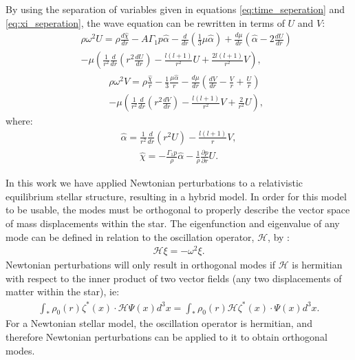 \documentclass[fleqn,usenatbib]{mnras}
\begin{document}
\hspace{\parindent}By using the separation of variables given in equations \ref{eq:time_seperation} and \ref{eq:xi_seperation}, the wave equation can be rewritten in terms of $U$ and $V$: 
\begin{align}\nonumber
&&\rho\omega^2U=\rho\frac{d\hat{\chi}}{dr}-A\Gamma_1 p\hat{\alpha}-\frac{d}{dr}\left(\frac{1}{3}\mu\hat{\alpha}\right)+\frac{d\mu}{dr}\left(\hat{\alpha}-2\frac{dU}{dr}\right)\\
&&-\mu\left(\frac{1}{r^2}\frac{d}{dr}\left( r^2\frac{dU}{dr}\right)-\frac{l(l+1)}{r^2}U+\frac{2l(l+1)}{r^2}V\right),
\label{eq:Ueqn}
\end{align}
\begin{align}\nonumber
&&\rho\omega^2V=\rho\frac{\hat{\chi}}{r}-\frac{1}{3}\frac{\mu\hat{\alpha}}{r}-\frac{d\mu}{dr}\left(\frac{dV}{dr}-\frac{V}{r}+\frac{U}{r}\right)\\
&&-\mu\left(\frac{1}{r^2}\frac{d}{dr}\left(r^2\frac{dV}{dr}\right)-\frac{l(l+1)}{r^2}V+\frac{2}{r^2}U\right),
\label{eq:Veqn}
\end{align}
\noindent where:
\begin{align}
\hat{\alpha}=\frac{1}{r^2}\frac{d}{dr}(r^2U)-\frac{l(l+1)}{r}V,
\label{eq:alphahat}
\end{align}
\begin{align}
\hat{\chi}=-\frac{\Gamma_1p}{\rho}\hat{\alpha}-\frac{1}{\rho}\frac{\partial p}{\partial r}U.
\label{eq:chihat}
\end{align}








\hspace{\parindent}In this work we have applied Newtonian perturbations to a relativistic equilibrium stellar structure, resulting in a hybrid model. In order for this model to be usable, the modes must be orthogonal to properly describe the vector space of mass displacements within the star. The eigenfunction and eigenvalue of any mode can be defined in relation to the oscillation operator, $\mathcal{H}$, by \citet{reisenegger1994multipole}:
\begin{align}
\mathcal{H}\xi=-\omega^2\xi.
\end{align}
\noindent Newtonian perturbations will only result in orthogonal modes if $\mathcal{H}$ is hermitian with respect to the inner product of two vector fields (any two displacements of matter within the star), ie:
\begin{align}
\int_*\rho_0(r)\zeta^*(x)\cdot\mathcal{H}\Psi(x)d^3x=\int_*\rho_0(r)\mathcal{H}\zeta^*(x)\cdot\Psi(x)d^3x.
\end{align}
\noindent For a Newtonian stellar model, the oscillation operator is hermitian, and therefore Newtonian perturbations can be applied to it to obtain orthogonal modes. 
\end{document}
